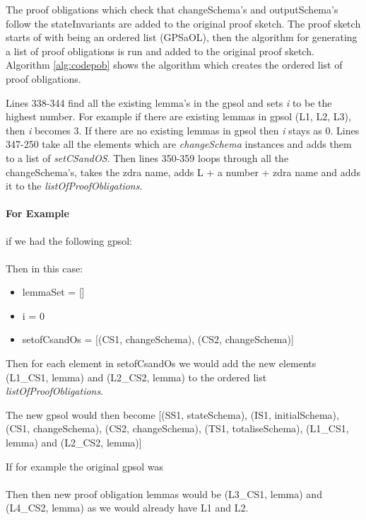 The proof obligations which check that changeSchema's and outputSchema's follow
the stateInvariants are added to the original proof sketch. 
The proof sketch starts of with being an ordered list (GPSaOL), then the
algorithm for generating a list of proof obligations is run and added to the
original proof sketch. Algorithm \ref{alg:codepob} shows the algorithm which
creates the ordered list of proof obligations.

Lines 338-344 find all the existing lemma's in the \gls{gpsol} and sets \emph{i}
to be the highest number. For example if there are existing lemmas in
\gls{gpsol} (L1, L2, L3), then \emph{i} becomes 3. If there are no existing
lemmas in \gls{gpsol} then \emph{i} stays as 0. Lines 347-250 take all the
elements which are \emph{changeSchema} instances and adds them to a list of
\emph{setCSandOS}. Then lines 350-359 loops through all the changeSchema's,
takes the \gls{zdra} name, adds L + a number + \gls{zdra} name and adds it to
the \emph{listOfProofObligations}.

\paragraph{For Example}

if we had the following \gls{gpsol}: \\
 \\
Then in this case:
\begin{itemize}
\item lemmaSet = []
\item i = 0
\item setofCsandOs = [(CS1, changeSchema), (CS2, changeSchema)]
\end{itemize}

Then for each element in setofCsandOs we would add the new elements (L1\_CS1,
lemma) and (L2\_CS2, lemma) to the ordered list \emph{listOfProofObligations}.

The new \gls{gpsol} would then become [(SS1, stateSchema), (IS1, initialSchema),
(CS1, changeSchema), (CS2, changeSchema), (TS1, totaliseSchema), (L1\_CS1,
lemma) and (L2\_CS2, lemma)]

If for example the original \gls{gpsol} was \\
\\
Then then new proof obligation lemmas would be (L3\_CS1, lemma) and (L4\_CS2,
lemma) as we would already have L1 and L2.

